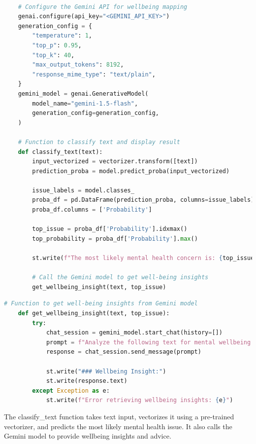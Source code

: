 \begin{tcolorbox}[colback=gray!5!white, colframe=gray!80!black, boxrule=0.5pt, title=Text Classification and Wellbeing Insight]
    \begin{lstlisting}[language=Python]

    # Configure the Gemini API for wellbeing mapping
    genai.configure(api_key="<GEMINI_API_KEY>")
    generation_config = {
        "temperature": 1,
        "top_p": 0.95,
        "top_k": 40,
        "max_output_tokens": 8192,
        "response_mime_type": "text/plain",
    }
    gemini_model = genai.GenerativeModel(
        model_name="gemini-1.5-flash",
        generation_config=generation_config,
    )

    # Function to classify text and display result
    def classify_text(text):
        input_vectorized = vectorizer.transform([text])
        prediction_proba = model.predict_proba(input_vectorized)
    
        issue_labels = model.classes_
        proba_df = pd.DataFrame(prediction_proba, columns=issue_labels).T
        proba_df.columns = ['Probability']
    
        top_issue = proba_df['Probability'].idxmax()
        top_probability = proba_df['Probability'].max()
    
        st.write(f"The most likely mental health concern is: {top_issue} with a probability of {top_probability:.2%}")
    
        # Call the Gemini model to get well-being insights
        get_wellbeing_insight(text, top_issue)
    \end{lstlisting}
\end{tcolorbox}

\begin{tcolorbox}[colback=gray!5!white, colframe=gray!80!black, boxrule=0.5pt, title=Text Classification and Wellbeing Insight]
    \begin{lstlisting}[language=Python]
    # Function to get well-being insights from Gemini model
    def get_wellbeing_insight(text, top_issue):
        try:
            chat_session = gemini_model.start_chat(history=[])
            prompt = f"Analyze the following text for mental wellbeing insights related to {top_issue}: {text}. Based on this, provide practical advice or actions the user can take to reduce or improve {top_issue}. Be supportive and provide actionable suggestions."
            response = chat_session.send_message(prompt)
    
            st.write("### Wellbeing Insight:")
            st.write(response.text)
        except Exception as e:
            st.write(f"Error retrieving wellbeing insights: {e}")
    \end{lstlisting}
    \end{tcolorbox}
\noindent
The classify\_text function takes text input, vectorizes it using a pre-trained vectorizer, and predicts the most likely mental health issue. It also calls the Gemini model to provide wellbeing insights and advice.    

